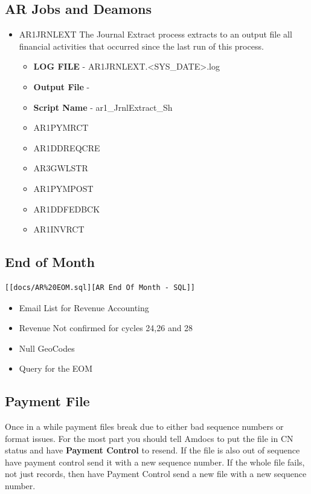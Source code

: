 \documentclass[12pt,twoside]{article}
\begin{document}
\subsection{AR Jobs and Deamons}
\label{sec:orgheadline61}
\begin{itemize}
\item AR1JRNLEXT
The Journal Extract process extracts to an output file all
     financial activities that occurred since the last run of
     this process.
\begin{itemize}
\item \textbf{LOG FILE} - AR1JRNLEXT.<SYS\_DATE>.log
\item \textbf{Output File} -
\item \textbf{Script Name} - ar1\_JrnlExtract\_Sh
\end{itemize}
\begin{itemize}
\item AR1PYMRCT
\item AR1DDREQCRE
\item AR3GWLSTR
\item AR1PYMPOST
\item AR1DDFEDBCK
\item AR1INVRCT
\end{itemize}
\end{itemize}
\subsection{End of Month}
\label{sec:orgheadline62}
\begin{verbatim}
[[docs/AR%20EOM.sql][AR End Of Month - SQL]]
\end{verbatim}
\begin{itemize}
\item Email List for Revenue Accounting
\item Revenue Not confirmed for cycles 24,26 and 28
\item Null GeoCodes
\item Query for the EOM
\end{itemize}

\subsection{Payment File}
\label{sec:orgheadline63}
Once in a while payment files break due to either bad sequence
numbers or format issues. For the most part you should tell
Amdocs to put the file in CN status and have \textbf{Payment Control}
to resend. If the file is also out of sequence have payment
control send it with a new sequence number. If the whole file
fails, not just records, then have Payment Control send a new
file with a new sequence number.
\end{document}
